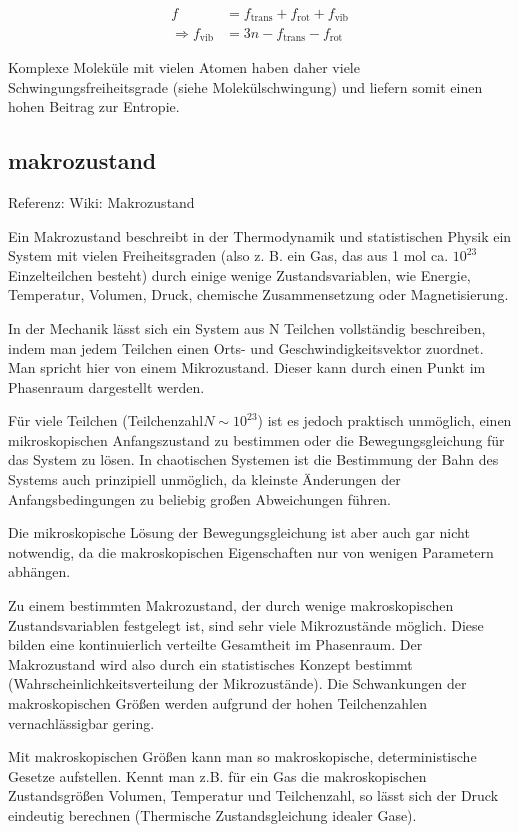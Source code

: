 \documentclass[]{article}
\begin{document}
\begin{align} f & = f_\mathrm{trans} + f_\mathrm{rot} + f_\mathrm{vib}\\ 
\Rightarrow f_\mathrm{vib} & = 3n - f_\mathrm{trans} - f_\mathrm{rot} 
\end{align}

Komplexe Moleküle mit vielen Atomen haben daher viele Schwingungsfreiheitsgrade (siehe Molekülschwingung) und liefern somit einen hohen Beitrag zur Entropie.





\subsection{makrozustand}
Referenz: Wiki: Makrozustand

Ein Makrozustand beschreibt in der Thermodynamik und statistischen Physik ein System mit vielen Freiheitsgraden (also z. B. ein Gas, das aus 1 mol ca. $10^{23}$ Einzelteilchen besteht) durch einige wenige Zustandsvariablen, wie Energie, Temperatur, Volumen, Druck, chemische Zusammensetzung oder Magnetisierung.

In der Mechanik lässt sich ein System aus N Teilchen vollständig beschreiben, indem man jedem Teilchen einen Orts- und Geschwindigkeitsvektor zuordnet. Man spricht hier von einem Mikrozustand. Dieser kann durch einen Punkt im Phasenraum dargestellt werden.

Für viele Teilchen (Teilchenzahl$ N \sim 10^{23}$) ist es jedoch praktisch unmöglich, einen mikroskopischen Anfangszustand zu bestimmen oder die Bewegungsgleichung für das System zu lösen. In chaotischen Systemen ist die Bestimmung der Bahn des Systems auch prinzipiell unmöglich, da kleinste Änderungen der Anfangsbedingungen zu beliebig großen Abweichungen führen.

Die mikroskopische Lösung der Bewegungsgleichung ist aber auch gar nicht notwendig, da die makroskopischen Eigenschaften nur von wenigen Parametern abhängen.

Zu einem bestimmten Makrozustand, der durch wenige makroskopischen Zustandsvariablen festgelegt ist, sind sehr viele Mikrozustände möglich. Diese bilden eine kontinuierlich verteilte Gesamtheit im Phasenraum. Der Makrozustand wird also durch ein statistisches Konzept bestimmt (Wahrscheinlichkeitsverteilung der Mikrozustände). Die Schwankungen der makroskopischen Größen werden aufgrund der hohen Teilchenzahlen vernachlässigbar gering.

Mit makroskopischen Größen kann man so makroskopische, deterministische Gesetze aufstellen. Kennt man z.B. für ein Gas die makroskopischen Zustandsgrößen Volumen, Temperatur und Teilchenzahl, so lässt sich der Druck eindeutig berechnen (Thermische Zustandsgleichung idealer Gase).
\end{document}
